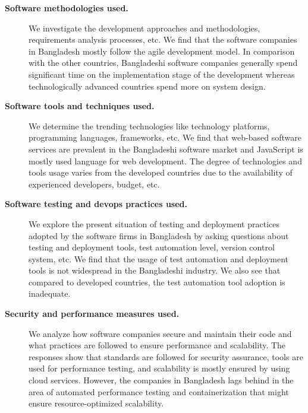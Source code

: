 \begin{description}
\item[\bf{Software methodologies used.}] We investigate the development
approaches and methodologies, requirements analysis processes, etc. We find that the software
companies in Bangladesh mostly follow the agile development model. In comparison with the
other countries, Bangladeshi software companies generally spend
significant time on the implementation stage of the development whereas
technologically advanced countries spend more on system design.
\item[\bf{Software tools and techniques used}.] We determine the
trending technologies like technology platforms, programming languages,
frameworks, etc. We find that web-based software services
are prevalent in the Bangladeshi software market and JavaScript is mostly used language for web
development. The degree of technologies and tools usage varies
from the developed countries due to the availability of experienced developers,
budget, etc. 
\item[\bf{Software testing and devops practices used}.] We explore the
present situation of testing and deployment practices adopted by the software
firms in Bangladesh by asking questions about testing and deployment tools, test
automation level, version control system, etc. We find
that the usage of test automation and deployment tools is not widespread in the
Bangladeshi industry. We also see that compared
to developed countries, the test automation tool adoption is inadequate. 
\item[\bf{Security and performance measures used}.] We analyze how
software companies secure and maintain their code and what practices are
followed to ensure performance and scalability. The responses show that
standards are followed for security assurance, tools are used for performance
testing, and scalability is mostly ensured by using cloud services. However, the companies in Bangladesh lags
behind in the area of automated performance testing and containerization that
might ensure resource-optimized scalability.
\end{description}

